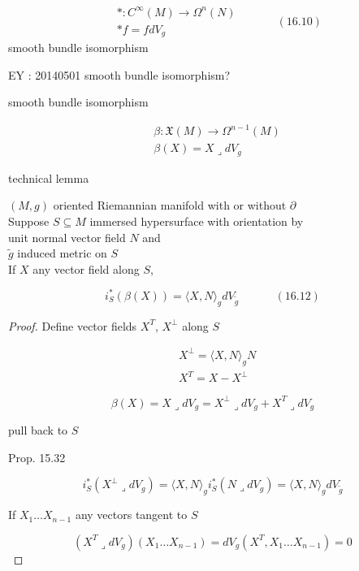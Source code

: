 \begin{equation}
  \begin{aligned}
    & * : C^{\infty}{ (M)} \to \Omega^n{ (N) } \\  
    & * f = f dV_g 
\end{aligned} \quad \quad \quad \, (16.10)
\end{equation}
smooth bundle isomorphism 

EY : 20140501 smooth bundle isomorphism? 

smooth bundle isomorphism

\[
\begin{aligned}
  & \beta : \mathfrak{X}{(M)} \to \Omega^{n-1}{ (M) } \\ 
  &  \beta(X) = X \lrcorner dV_g
\end{aligned}
\]

technical lemma
\begin{lemma}[16.30]
  $(M,g)$ oriented Riemannian manifold with or without $\partial$ \\
  Suppose $S \subseteq M$ immersed hypersurface with orientation by \\
\phantom{Suppose } unit normal vector field $N$ and \\
\phantom{Suppose } $\widetilde{g}$ induced metric on $S$ \\

If $X$ any vector field along $S$, 

\begin{equation}
  i^*_S{ (\beta{ (X)} )}  = \langle X, N \rangle_g dV_{\widetilde{g}} \quad \quad \quad \, (16.12)
\end{equation}



\end{lemma}

\begin{proof}
Define vector fields $X^T$, $X^{\perp}$ along $S$

\[
\begin{aligned}
&  X^{\perp} = \langle X, N\rangle_g N \\ 
&  X^T =  X - X^{\perp}
\end{aligned}
\]

\[
\beta(X) = X \lrcorner dV_g = X^{\perp} \lrcorner dV_g + X^T \lrcorner dV_g
\]

pull back to $S$

Prop. 15.32


\[
i^*_S{ (X^{\perp} \lrcorner dV_g) }  = \langle X, N \rangle_g i^*_S{ (N \lrcorner dV_g) } = \langle X, N \rangle_g dV_{ \widetilde{g}}
\]

If $X_1 \dots X_{n-1}$ any vectors tangent to $S$

\[
(X^T \lrcorner dV_g){ (X_1 \dots X_{n-1} ) } = dV_g{ (X^T, X_1 \dots X_{n-1} ) } = 0 
\]



\end{proof}
